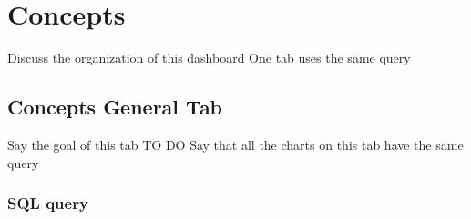 \documentclass[]{book}
\begin{document}
\chapter{Concepts}\label{concepts}

Discuss the organization of this dashboard One tab uses the same query

\section{Concepts General Tab}\label{concepts-general-tab}

Say the goal of this tab TO DO Say that all the charts on this tab have
the same query

\subsection{SQL query}\label{sql-query-16}
\end{document}
